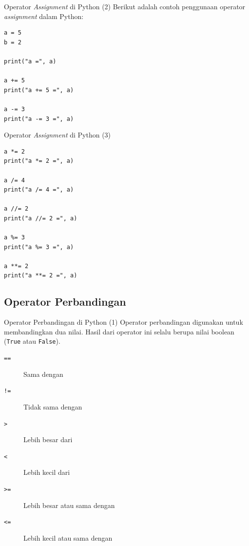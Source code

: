\documentclass[aspectratio=169, table]{beamer}
\begin{document}
\begin{frame}[fragile]{Operator \textit{Assignment} di Python (2)}
Berikut adalah contoh penggunaan operator \textit{assignment} dalam Python:
\begin{lstlisting}[style=PythonStyle, caption={Kode Python: assignment_operator.py}]
a = 5
b = 2

print("a =", a)

a += 5
print("a += 5 =", a)

a -= 3
print("a -= 3 =", a)
\end{lstlisting}
\end{frame}

\begin{frame}[fragile]{Operator \textit{Assignment} di Python (3)}

\begin{lstlisting}[style=PythonStyle, caption={Kode Python: assignment_operator.py}]
a *= 2
print("a *= 2 =", a)

a /= 4
print("a /= 4 =", a)

a //= 2
print("a //= 2 =", a)

a %= 3
print("a %= 3 =", a)

a **= 2
print("a **= 2 =", a)
\end{lstlisting}

\end{frame}

\subsection{Operator Perbandingan}

\begin{frame}[fragile]{Operator Perbandingan di Python (1)}
Operator perbandingan digunakan untuk membandingkan dua nilai. 
Hasil dari operator ini selalu berupa nilai boolean (\texttt{True} atau \texttt{False}).

\begin{description}
    \item[\texttt{==}] Sama dengan
    \item[\texttt{!=}] Tidak sama dengan
    \item[\texttt{>} ] Lebih besar dari
    \item[\texttt{<}] Lebih kecil dari
    \item[\texttt{>=}] Lebih besar atau sama dengan
    \item[\texttt{<=}] Lebih kecil atau sama dengan
\end{description}
\end{frame}
\end{document}
